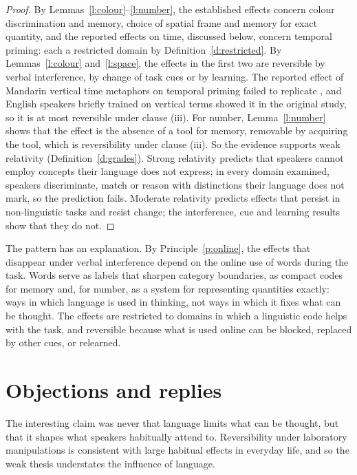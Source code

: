 \documentclass{situationist-preprint}
\begin{document}
\begin{proof}
By Lemmas~\ref{l:colour}--\ref{l:number}, the established effects concern colour discrimination and memory, choice of spatial frame and memory for exact quantity, and the reported effects on time, discussed below, concern temporal priming: each a restricted domain by Definition~\ref{d:restricted}. By Lemmas~\ref{l:colour} and~\ref{l:space}, the effects in the first two are reversible by verbal interference, by change of task cues or by learning. The reported effect of Mandarin vertical time metaphors on temporal priming \citep{Boroditsky2001} failed to replicate \citep{Chen2007,JanuaryKako2007}, and English speakers briefly trained on vertical terms showed it in the original study, so it is at most reversible under clause (iii). For number, Lemma~\ref{l:number} shows that the effect is the absence of a tool for memory, removable by acquiring the tool, which is reversibility under clause (iii). So the evidence supports weak relativity (Definition~\ref{d:grades}). Strong relativity predicts that speakers cannot employ concepts their language does not express; in every domain examined, speakers discriminate, match or reason with distinctions their language does not mark, so the prediction fails. Moderate relativity predicts effects that persist in non-linguistic tasks and resist change; the interference, cue and learning results show that they do not.
\end{proof}

The pattern has an explanation. By Principle~\ref{p:online}, the effects that disappear under verbal interference depend on the online use of words during the task. Words serve as labels that sharpen category boundaries, as compact codes for memory and, for number, as a system for representing quantities exactly: ways in which language is used in thinking, not ways in which it fixes what can be thought. The effects are restricted to domains in which a linguistic code helps with the task, and reversible because what is used online can be blocked, replaced by other cues, or relearned.

\section{Objections and replies}

\begin{objection}\label{o:habitual}
The interesting claim was never that language limits what can be thought, but that it shapes what speakers habitually attend to. Reversibility under laboratory manipulations is consistent with large habitual effects in everyday life, and so the weak thesis understates the influence of language.
\end{objection}
\end{document}
